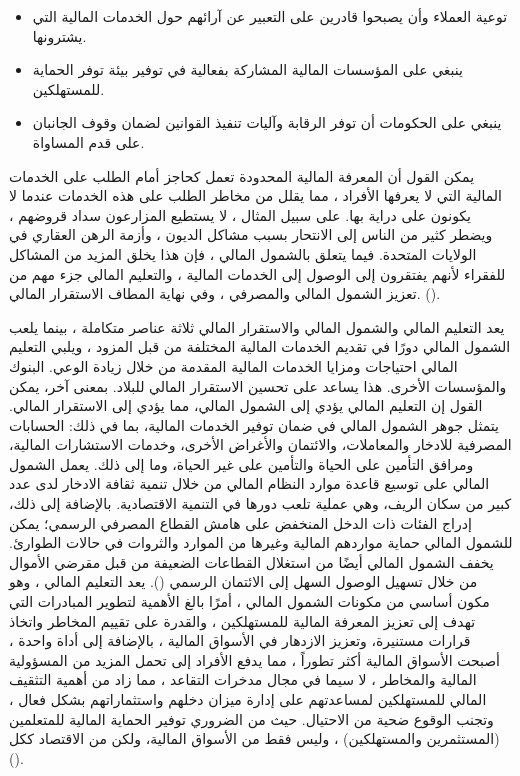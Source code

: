 \documentclass[10pt,a4paper]{report}
\begin{document}
\begin{doublespacing}
\begin{itemize}
	\item توعية العملاء وأن يصبحوا قادرين على التعبير عن آرائهم حول الخدمات المالية التي يشترونها.
	\item ينبغي على المؤسسات المالية المشاركة بفعالية في توفير بيئة توفر الحماية للمستهلكين.
	\item ينبغي على الحكومات أن توفر الرقابة وآليات تنفيذ القوانين لضمان وقوف الجانبان على قدم المساواة.
\end{itemize}

يمكن القول أن المعرفة المالية المحدودة تعمل كحاجز أمام الطلب على الخدمات المالية التي لا يعرفها الأفراد ، مما يقلل من مخاطر الطلب على هذه الخدمات عندما لا يكونون على دراية بها. على سبيل المثال ، لا يستطيع المزارعون سداد قروضهم ، ويضطر كثير من الناس إلى الانتحار بسبب مشاكل الديون ، وأزمة الرهن العقاري في الولايات المتحدة. فيما يتعلق بالشمول المالي ، فإن هذا يخلق المزيد من المشاكل للفقراء لأنهم يفتقرون إلى الوصول إلى الخدمات المالية ، والتعليم المالي جزء مهم من تعزيز الشمول المالي والمصرفي ، وفي نهاية المطاف الاستقرار المالي. ().

يعد التعليم المالي والشمول المالي والاستقرار المالي ثلاثة عناصر متكاملة ، بينما يلعب الشمول المالي دورًا في تقديم الخدمات المالية المختلفة من قبل المزود ، ويلبي التعليم المالي احتياجات ومزايا الخدمات المالية المقدمة من خلال زيادة الوعي. البنوك والمؤسسات الأخرى. هذا يساعد على تحسين الاستقرار المالي للبلاد. بمعنى آخر، يمكن القول إن التعليم المالي يؤدي إلى الشمول المالي، مما يؤدي إلى الاستقرار المالي. يتمثل جوهر الشمول المالي في ضمان توفير الخدمات المالية، بما في ذلك: الحسابات المصرفية للادخار والمعاملات، والائتمان والأغراض الأخرى، وخدمات الاستشارات المالية، ومرافق التأمين على الحياة والتأمين على غير الحياة، وما إلى ذلك. يعمل الشمول المالي على توسيع قاعدة موارد النظام المالي من خلال تنمية ثقافة الادخار لدى عدد كبير من سكان الريف، وهي عملية تلعب دورها في التنمية الاقتصادية. بالإضافة إلى ذلك، إدراج الفئات ذات الدخل المنخفض على هامش القطاع المصرفي الرسمي؛ يمكن للشمول المالي حماية مواردهم المالية وغيرها من الموارد والثروات في حالات الطوارئ. يخفف الشمول المالي أيضًا من استغلال القطاعات الضعيفة من قبل مقرضي الأموال من خلال تسهيل الوصول السهل إلى الائتمان الرسمي (). يعد التعليم المالي ، وهو مكون أساسي من مكونات الشمول المالي ، أمرًا بالغ الأهمية لتطوير المبادرات التي تهدف إلى تعزيز المعرفة المالية للمستهلكين ، والقدرة على تقييم المخاطر واتخاذ قرارات مستنيرة، وتعزيز الازدهار في الأسواق المالية ، بالإضافة إلى أداة واحدة ، أصبحت الأسواق المالية أكثر تطوراً ، مما يدفع الأفراد إلى تحمل المزيد من المسؤولية المالية والمخاطر ، لا سيما في مجال مدخرات التقاعد ، مما زاد من أهمية التثقيف المالي للمستهلكين لمساعدتهم على إدارة ميزان دخلهم واستثماراتهم بشكل فعال ، وتجنب الوقوع ضحية من الاحتيال. حيث من الضروري توفير الحماية المالية للمتعلمين (المستثمرين والمستهلكين) ، وليس فقط من الأسواق المالية، ولكن من الاقتصاد ككل ().

\end{doublespacing}
\end{document}
